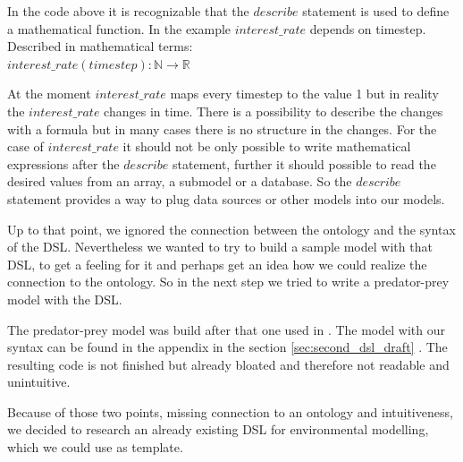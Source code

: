 \par
In the code above it is recognizable that the $describe$ statement is used to define a mathematical function. In the example $interest\_rate$ depends on timestep. Described in mathematical terms:\\
$interest\_rate(timestep) : \mathbb{N} \rightarrow  \mathbb{R}$
\par
At the moment $interest\_rate$ maps every timestep to the value 1 but in reality the $interest\_rate$ changes in time. There is a possibility to describe the changes with a formula but in many cases there is no structure in the changes. For the case of $interest\_rate$ it should not be only possible to write mathematical expressions after the $describe$ statement, further it should possible to read the desired values from an array, a submodel or a database. So the $describe$ statement provides a way to plug data sources or other models into our models.
\par
Up to that point, we ignored the connection between the ontology and the syntax of the DSL. Nevertheless we wanted to try to build a sample model with that DSL, to get a feeling for it and perhaps get an idea how we could realize the connection to the ontology. So in the next step we tried to write a predator-prey model with the DSL.
\par
The predator-prey model was build after that one used in \autocite{dsl:dynamo}. The model with our syntax can be found in the appendix in the section \ref{sec:second_dsl_draft} .
The resulting code is not finished but already bloated and therefore not readable and unintuitive.
\par
Because of those two points, missing connection to an ontology and intuitiveness, we decided to research an already existing DSL for environmental modelling, which we could use as template.


